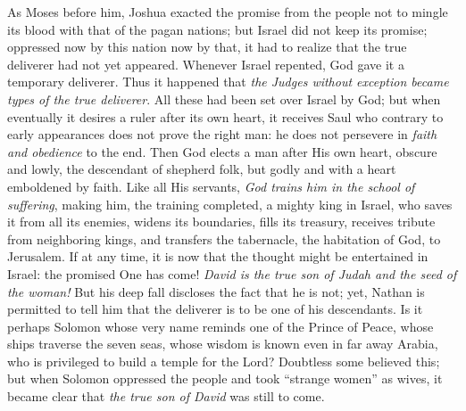 As Moses before him, Joshua exacted the promise from the people not to mingle its blood with that of the pagan nations; but Israel did not keep its promise; oppressed now by this nation now by that, it had to realize that the true deliverer had not yet appeared. Whenever Israel repented, God gave it a temporary deliverer. Thus it happened that \emph{the Judges without exception became types of the true deliverer}. All these had been set over Israel by God; but when eventually it desires a ruler after its own heart, it receives Saul who contrary to early appearances does not prove the right man: he does not persevere in \emph{faith and obedience} to the end. Then God elects a man after His own heart, obscure and lowly, the descendant of shepherd folk, but godly and with a heart emboldened by faith. Like all His servants, \emph{God trains him in the school of suffering}, making him, the training completed, a mighty king in Israel, who saves it from all its enemies, widens its boundaries, fills its treasury, receives tribute from neighboring kings, and transfers the tabernacle, the habitation of God, to Jerusalem. If at any time, it is now that the thought might be entertained in Israel: the promised One has come! \emph{David is the true son of Judah and the seed of the woman!} But his deep fall discloses the fact that he is not; yet, Nathan is permitted to tell him that the deliverer is to be one of his descendants. Is it perhaps Solomon whose very name reminds one of the Prince
of Peace, whose ships traverse the seven seas, whose wisdom is known even in far away Arabia, who is privileged to build a temple for the Lord? Doubtless some believed this; but when Solomon oppressed the people and took “strange women” as wives, it became clear that \emph{the true son of David} was still to come.

